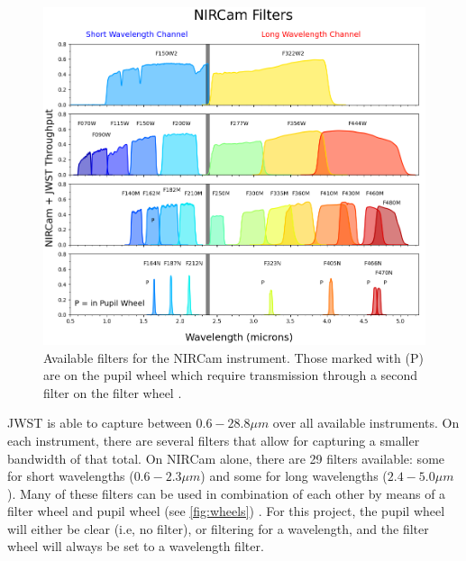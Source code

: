 \documentclass[10pt,twocolumn,letterpaper]{article}
\begin{document}
\begin{figure}[t]
  \centering
  \includegraphics[scale=0.33]{filters}
  \caption{Available filters for the NIRCam instrument. Those marked with (P) are on the pupil wheel which require transmission through a second filter on the filter wheel \cite{webbfilters}.}
  \label{fig:filters}
\end{figure}

JWST is able to capture between $0.6 - 28.8\mu m$ over all available instruments. On each instrument, there are several filters that allow for capturing a smaller bandwidth of that total.
On NIRCam alone, there are 29 filters available: some for short wavelengths ($0.6 - 2.3 \mu m$) and some for long wavelengths ($2.4 - 5.0 \mu m$). Many of these filters can be used in combination of each other by means of a filter wheel and pupil wheel (see \cref{fig:wheels}) \cite{webbfilters}\cite{webbwheels}. 
For this project, the pupil wheel will either be clear (i.e, no filter), or filtering for a wavelength, and the filter wheel will always be set to a wavelength filter.
\end{document}
